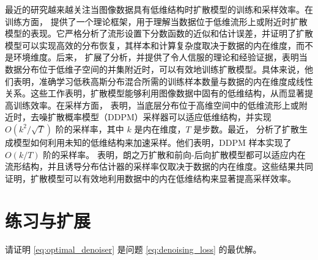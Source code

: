\documentclass[../../book-main.tex]{subfiles}
\begin{document}

 
最近的研究越来越关注当图像数据具有低维结构时扩散模型的训练和采样效率。在训练方面，\cite{chen2023score} 提供了一个理论框架，用于理解当数据位于低维流形上或附近时扩散模型的表现。它严格分析了流形设置下分数函数的近似和估计误差，并证明了扩散模型可以实现高效的分布恢复，其样本和计算复杂度取决于数据的内在维度，而不是环境维度。后来，\cite{wang2024diffusion} 扩展了分析，并提供了令人信服的理论和经验证据，表明当数据分布位于低维子空间的并集附近时，可以有效地训练扩散模型。具体来说，他们表明，准确学习低秩高斯分布混合所需的训练样本数量与数据的内在维度成线性关系。这些工作表明，扩散模型能够利用图像数据中固有的低维结构，从而显著提高训练效率。在采样方面，\cite{li2024adapting} 表明，当底层分布位于高维空间中的低维流形上或附近时，去噪扩散概率模型（DDPM）采样器可以适应低维结构，并实现 $O(k^2/\sqrt{T})$ 阶的采样率，其中 $k$ 是内在维度，$T$ 是步数。最近，\cite{liang2025low} 分析了扩散生成模型如何利用未知的低维结构来加速采样。他们表明，DDPM 样本实现了 $O(k/T)$ 阶的采样率。\cite{tang2024adaptivity} 表明，朗之万扩散和前向-后向扩散模型都可以适应内在流形结构，并且诱导分布估计器的采样率仅取决于数据的内在维度。这些结果共同证明，扩散模型可以有效地利用数据中的内在低维结构来显著提高采样效率。















\section{练习与扩展}

\begin{exercise}
    请证明 \eqref{eq:optimal_denoiser} 是问题 \eqref{eq:denoising_loss} 的最优解。
\end{exercise}
\end{document}
